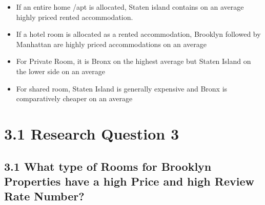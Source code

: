 \documentclass[11pt]{article}
\providecommand{\tightlist}{%
      \setlength{\itemsep}{0pt}\setlength{\parskip}{0pt}}
\begin{document}
\begin{itemize}
\tightlist
\item
  If an entire home /apt is allocated, Staten island contains on an
  average highly priced rented accommodation.
\item
  If a hotel room is allocated as a rented accommodation, Brooklyn
  followed by Manhattan are highly priced accommodations on an average
\item
  For Private Room, it is Bronx on the highest average but Staten Island
  on the lower side on an average
\item
  For shared room, Staten Island is generally expensive and Bronx is
  comparatively cheaper on an average
\end{itemize}

    \hypertarget{research-question-3}{%
\section{3.1 Research Question 3}\label{research-question-3}}

\hypertarget{what-type-of-rooms-for-brooklyn-properties-have-a-high-price-and-high-review-rate-number}{%
\subsection{3.1 What type of Rooms for Brooklyn Properties have a high
Price and high Review Rate
Number?}\label{what-type-of-rooms-for-brooklyn-properties-have-a-high-price-and-high-review-rate-number}}
\end{document}
